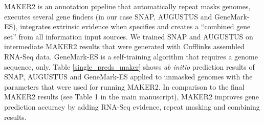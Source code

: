 \documentclass[a4paper,10pt]{report}
\begin{document}

MAKER2 is an annotation pipeline that automatically repeat masks genomes, executes several gene finders (in our case SNAP, AUGUSTUS and GeneMark-ES), integrates extrinsic evidence when specifies and creates a ``combined gene set'' from all information input sources. We trained SNAP and AUGUSTUS on intermediate MAKER2 results that were generated with Cufflinks assembled RNA-Seq data. GeneMark-ES is a self-training algorithm that requires a genome sequence, only. Table \ref{single_preds_maker} shows \textit{ab initio} prediction results of SNAP, AUGUSTUS and GeneMark-ES applied to unmasked genomes with the parameters that were used for running MAKER2. In comparison to the final MAKER2 results (see Table 1 in the main manuscript), MAKER2 improves gene prediction accuracy by adding RNA-Seq evidence, repeat masking and combining results.
\end{document}
